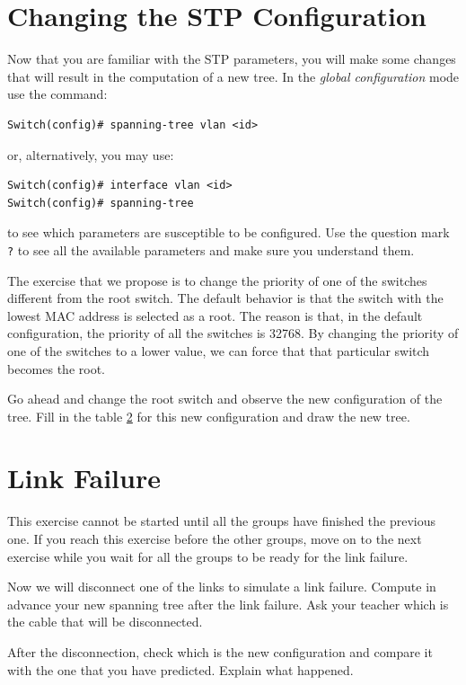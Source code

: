 \section{Changing the STP Configuration}

Now that you are familiar with the STP parameters, you will make some changes that will result in the computation of a new tree. In the \emph{global configuration} mode use the command:

\begin{lstlisting} 
Switch(config)# spanning-tree vlan <id>
\end{lstlisting}
or, alternatively, you may use:

\begin{lstlisting}
Switch(config)# interface vlan <id>
Switch(config)# spanning-tree
\end{lstlisting}
to see which parameters are susceptible to be configured. Use the question mark \texttt{\color{blue}?} to see all the available parameters and make sure you understand them.

The exercise that we propose is to change the priority of one of the switches different from the root switch. The default behavior is that the switch with the lowest MAC address is selected as a root. The reason is that, in the default configuration, the priority of all the switches is 32768. By changing the priority of one of the switches to a lower value, we can force that that particular switch becomes the root.

Go ahead and change the root switch and observe the new configuration of the tree. Fill in the {\color{red}table \ref{}} for this new configuration and draw the new tree.

\section{Link Failure}

This exercise cannot be started until all the groups have finished the previous one. If you reach this exercise before the other groups, move on to the next exercise while you wait for all the groups to be ready for the link failure.

Now we will disconnect one of the links to simulate a link failure. Compute in advance your new spanning tree after the link failure. Ask your teacher which is the cable that will be disconnected.

After the disconnection, check which is the new configuration and compare it with the one that you have predicted. Explain what happened.

